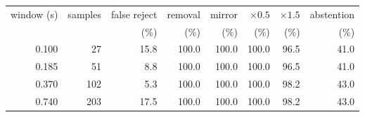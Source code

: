 \scriptsize
\begin{tabular}{rrrrrrrr}
\toprule
window (s) & samples & false reject & removal & mirror & $\times 0.5$ & $\times 1.5$ & abstention \\
 & & (\%) & (\%) & (\%) & (\%) & (\%) & (\%) \\
\midrule
0.100 & 27 & 15.8 & 100.0 & 100.0 & 100.0 & 96.5 & 41.0 \\
0.185 & 51 & 8.8 & 100.0 & 100.0 & 100.0 & 96.5 & 41.0 \\
0.370 & 102 & 5.3 & 100.0 & 100.0 & 100.0 & 98.2 & 43.0 \\
0.740 & 203 & 17.5 & 100.0 & 100.0 & 100.0 & 98.2 & 43.0 \\
\bottomrule
\end{tabular}
